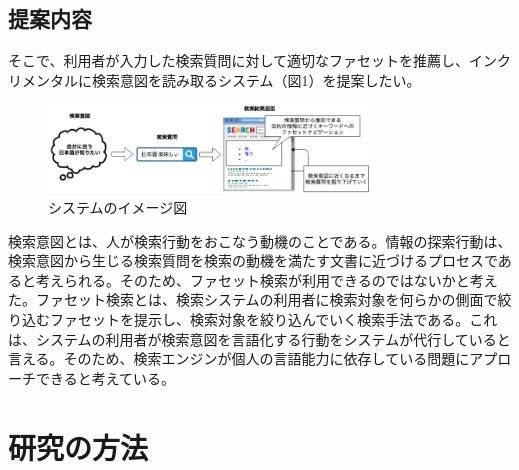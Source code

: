 \documentclass[a4j,10pt, twocolumn]{jarticle} \usepackage[dvipdfmx]{graphicx} \usepackage{amssymb} \usepackage{amsmath}
\begin{document}
\subsection{提案内容}

 そこで、利用者が入力した検索質問に対して適切なファセットを推薦し、インクリメンタルに検索意図を読み取るシステム（図1）を提案したい。

 \begin{figure}[ht]
   \includegraphics[width=85mm]{./new_ir_with_navi.png}
   \caption{システムのイメージ図}
 \end{figure}
 
 検索意図とは、人が検索行動をおこなう動機のことである。情報の探索行動は、検索意図から生じる検索質問を検索の動機を満たす文書に近づけるプロセスであると考えられる。そのため、ファセット検索が利用できるのではないかと考えた。ファセット検索とは、検索システムの利用者に検索対象を何らかの側面で絞り込むファセットを提示し、検索対象を絞り込んでいく検索手法である\cite{faceted}。これは、システムの利用者が検索意図を言語化する行動をシステムが代行していると言える。そのため、検索エンジンが個人の言語能力に依存している問題にアプローチできると考えている。
\section{研究の方法}
\end{document}

